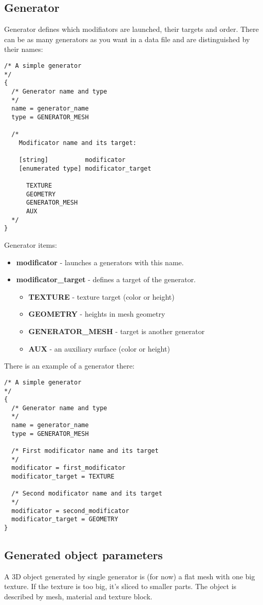 \documentclass[9pt]{article}
\begin{document}
\subsection{Generator}
Generator defines which modifiators are launched, their targets and order. 
There can be as many generators as you want in a data file and 
are distinguished by their names:
\begin{verbatim}
/* A simple generator
*/
{
  /* Generator name and type
  */
  name = generator_name
  type = GENERATOR_MESH

  /*
    Modificator name and its target:
    
    [string]          modificator
    [enumerated type] modificator_target
      
      TEXTURE
      GEOMETRY
      GENERATOR_MESH
      AUX
  */
}
\end{verbatim}
Generator items:
\begin{itemize}
\item{\bf modificator} - launches a generators with this name.
\item{\bf modificator\_target} - defines a target of the generator.
\begin{itemize}
\item{\bf TEXTURE} - texture target (color or height)
\item{\bf GEOMETRY} - heights in mesh geometry
\item{\bf GENERATOR\_MESH} - target is another generator
\item{\bf AUX} - an auxiliary surface (color or height)
\end{itemize}
\end{itemize}
There is an example of a generator there:
\begin{verbatim}
/* A simple generator
*/
{
  /* Generator name and type
  */
  name = generator_name
  type = GENERATOR_MESH

  /* First modificator name and its target
  */
  modificator = first_modificator
  modificator_target = TEXTURE
  
  /* Second modificator name and its target
  */
  modificator = second_modificator
  modificator_target = GEOMETRY
}
\end{verbatim}

\subsection{Generated object parameters}
A 3D object generated by single generator is (for now) a flat mesh with
one big texture. If the texture is too big, it's sliced to smaller parts.
The object is described by mesh, material and texture block.
\end{document}
